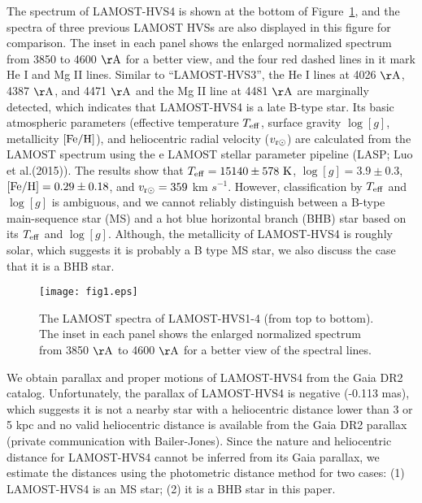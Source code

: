 \documentclass[iop, aj]{emulateapj}
\begin{document}
The spectrum of LAMOST-HVS4 is shown at the bottom of Figure~\ref{fig:spectra}, and the spectra of three previous LAMOST HVSs are also displayed in this figure for comparison. The inset in each panel shows the enlarged normalized spectrum from 3850 to 4600 $\rm\AA$ for a better view, and the four red dashed lines in it mark He I and Mg II lines. Similar to ``LAMOST-HVS3'', the He I lines at 4026 $\rm\AA$, 4387 $\rm\AA$, and 4471 $\rm\AA$ and the Mg II line at 4481 $\rm\AA$ are marginally detected, which indicates that LAMOST-HVS4 is a late B-type star. Its basic atmospheric parameters (effective temperature $T_{\rm eff}$, surface gravity $\log[g]$, metallicity $[{\rm Fe/H}]$), and heliocentric radial velocity ($v_{\rm r\odot}$) are calculated from the LAMOST spectrum using the e LAMOST stellar parameter pipeline (LASP; Luo et al.(2015)). The results show that $T_{\rm eff} = 15140 \pm 578~{\rm K}$, $\log[g] = 3.9 \pm 0.3$, $[{\rm Fe/H}] = 0.29 \pm 0.18$, and $v_{\rm r\odot} = 359$ km $s^{-1}$. However, classification by $T_{\rm eff}$ and $\log[g]$ is ambiguous, and we cannot reliably distinguish between a B-type main-sequence star (MS) and a hot blue horizontal branch (BHB) star based on its $T_{\rm eff}$ and $\log[g]$. Although, the metallicity of LAMOST-HVS4 is roughly solar, which suggests it is probably a B type MS star, we also discuss the case that it is a BHB star.

\begin{figure*}
\begin{center}
\texttt{[image: fig1.eps]}
\caption{The LAMOST spectra of LAMOST-HVS1-4 (from top to bottom). The inset in each panel shows the enlarged normalized spectrum from 3850 $\rm\AA$ to 4600 $\rm\AA$ for a better view of the spectral lines. \label{fig:spectra}}
\end{center}
\end{figure*}

We obtain parallax and proper motions of LAMOST-HVS4 from the Gaia DR2 catalog. Unfortunately, the parallax of LAMOST-HVS4 is negative (-0.113 mas), which suggests it is not a nearby star with a heliocentric distance lower than 3 or 5 kpc and no valid heliocentric distance is available from the Gaia DR2 parallax (private communication with Bailer-Jones). Since the nature and heliocentric distance for LAMOST-HVS4 cannot be inferred from its Gaia parallax, we estimate the distances using the photometric distance method for two cases: (1) LAMOST-HVS4 is an MS star; (2) it is a BHB star in this paper.
\end{document}
